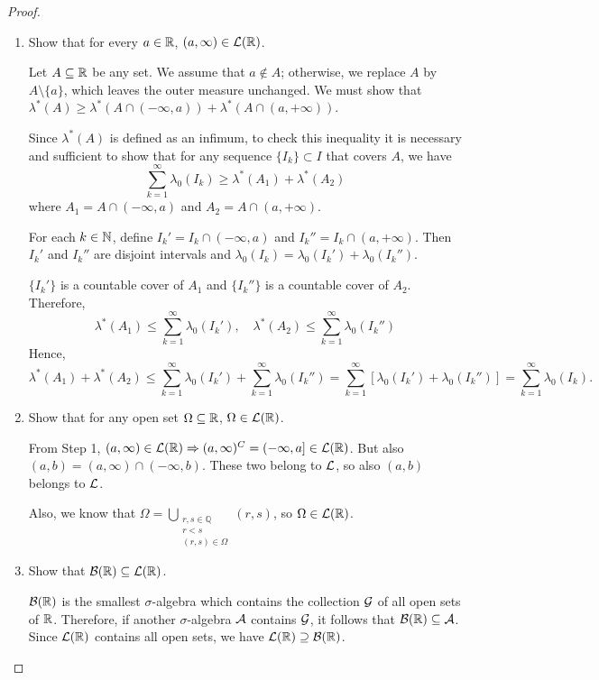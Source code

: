 \begin{proof}
\begin{enumerate} [label=\arabic*.]
    \item Show that for every $a \in \mathbb{R}$, $(a, \infty) \in \mathcal{L}(\mathbb{R})$.

    Let $A \subseteq \mathbb{R}$ be any set. We assume that $a \notin A$; otherwise, we replace $A$ by $A \setminus \{a\}$, which leaves the outer measure unchanged.
    We must show that $\lambda^*(A) \geq \lambda^*(A \cap (-\infty, a)) + \lambda^*(A \cap (a, +\infty))$.

    Since $\lambda^*(A)$ is defined as an infimum, to check this inequality it is necessary and sufficient to show that for any sequence $\{I_k\} \subset I$ that covers $A$, we have
    \[
    \sum_{k=1}^{\infty} \lambda_0(I_k) \geq \lambda^*(A_1) + \lambda^*(A_2)
    \]
    where $A_1 = A \cap (-\infty, a)$ and $A_2 = A \cap (a, +\infty)$.

    For each $k \in \mathbb{N}$, define $I_k' = I_k \cap (-\infty, a)$ and $I_k'' = I_k \cap (a, +\infty)$. Then $I_k'$ and $I_k''$ are disjoint intervals and $\lambda_0(I_k) = \lambda_0(I_k') + \lambda_0(I_k'')$.

    $\{I_k'\}$ is a countable cover of $A_1$ and $\{I_k''\}$ is a countable cover of $A_2$. Therefore,
    \[
    \lambda^*(A_1) \leq \sum_{k=1}^{\infty} \lambda_0(I_k'), \quad \lambda^*(A_2) \leq \sum_{k=1}^{\infty} \lambda_0(I_k'')
    \]
    Hence,
    \[
    \lambda^*(A_1) + \lambda^*(A_2) \leq \sum_{k=1}^{\infty} \lambda_0(I_k') + \sum_{k=1}^{\infty} \lambda_0(I_k'') = \sum_{k=1}^{\infty} [\lambda_0(I_k') + \lambda_0(I_k'')] = \sum_{k=1}^{\infty} \lambda_0(I_k).
    \]

    \item Show that for any open set $\Omega \subseteq \mathbb{R}$, $\Omega \in \mathcal{L}(\mathbb{R})$.

    From Step 1, $(a, \infty) \in \mathcal{L}(\mathbb{R}) \Rightarrow (a, \infty)^C = (-\infty, a] \in \mathcal{L}(\mathbb{R})$.
    But also $(a, b) = (a, \infty) \cap (-\infty, b)$. These two belong to $\mathcal{L}$, so also $(a, b)$ belongs to $\mathcal{L}$.

    Also, we know that $\Omega = \bigcup_{\substack{r,s \in \mathbb{Q} \\ r < s \\ (r,s) \in \Omega}} (r,s)$, so $\Omega \in \mathcal{L}(\mathbb{R})$.

    \item Show that $\mathcal{B}(\mathbb{R}) \subseteq \mathcal{L}(\mathbb{R})$.

    $\mathcal{B}(\mathbb{R})$ is the smallest $\sigma$-algebra which contains the collection $\mathcal{G}$ of all open sets of $\mathbb{R}$.
    Therefore, if another $\sigma$-algebra $\mathcal{A}$ contains $\mathcal{G}$, it follows that $\mathcal{B}(\mathbb{R}) \subseteq \mathcal{A}$.
    Since $\mathcal{L}(\mathbb{R})$ contains all open sets, we have $\mathcal{L}(\mathbb{R}) \supseteq \mathcal{B}(\mathbb{R})$.
\end{enumerate}
\end{proof}

